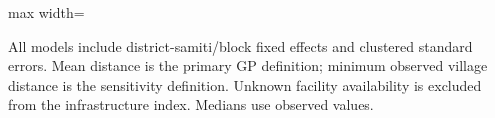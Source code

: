 \begin{adjustbox}{max width=\linewidth}
\begin{threeparttable}[b]
      \begin{tablenotes}
         \item All models include district-samiti/block fixed effects and clustered standard errors. Mean distance is the primary GP definition; minimum observed village distance is the sensitivity definition. Unknown facility availability is excluded from the infrastructure index. Medians use observed values.
      \end{tablenotes}
   \end{threeparttable}
\end{adjustbox}
\par\endgroup


